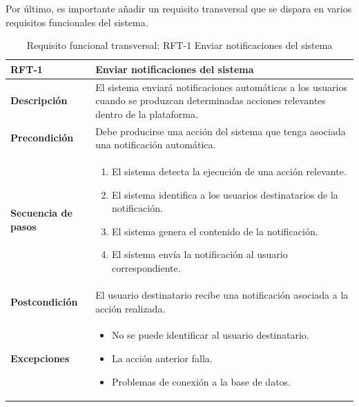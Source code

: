 Por último, es importante añadir un requisito transversal que se dispara en varios requisitos funcionales del sistema.
\begin{table}[H]
\centering
\begin{tabularx}{\textwidth}{
|>{\centering\arraybackslash}l
|>{\centering\arraybackslash}X|}
\hline
\textbf{RFT-1} & \textbf{Enviar notificaciones del sistema} \\ \hline

\textbf{Descripción} & El sistema enviará notificaciones automáticas a los usuarios cuando se produzcan determinadas acciones relevantes dentro de la plataforma. \\ \hline

\textbf{Precondición} & Debe producirse una acción del sistema que tenga asociada una notificación automática. \\ \hline

\textbf{Secuencia de pasos} &
\begin{enumerate}
  \item El sistema detecta la ejecución de una acción relevante.
  \item El sistema identifica a los usuarios destinatarios de la notificación.
  \item El sistema genera el contenido de la notificación.
  \item El sistema envía la notificación al usuario correspondiente.
\end{enumerate} \\ \hline

\textbf{Postcondición} & El usuario destinatario recibe una notificación asociada a la acción realizada. \\ \hline

\textbf{Excepciones} &
\begin{itemize}
  \item No se puede identificar al usuario destinatario.
  \item La acción anterior falla.
  \item Problemas de conexión a la base de datos.
\end{itemize} \\ \hline
\end{tabularx}
\caption{Requisito funcional transversal: RFT-1 Enviar notificaciones del sistema}
\label{tab:RFT-1}
\end{table}
